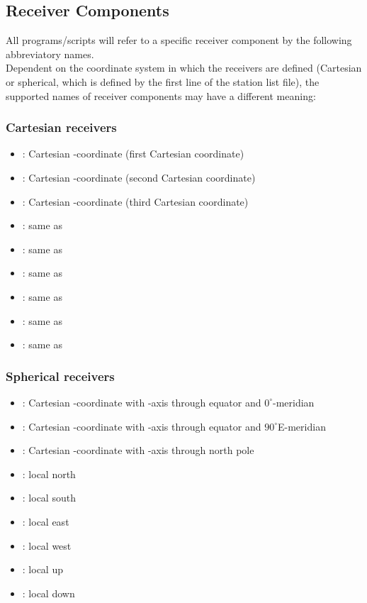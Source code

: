 \subsection*{Receiver Components}
%
All programs/scripts will refer to a specific receiver component by the following abbreviatory names.\\
Dependent on the coordinate system in which the receivers are defined (Cartesian or spherical, which is 
defined by the first line of the station list file), the supported names of receiver components may have a 
different meaning:
\subsubsection{Cartesian receivers}
\begin{itemize}
\item[] : Cartesian -coordinate (first Cartesian coordinate)
\item[] : Cartesian -coordinate (second Cartesian coordinate)
\item[] : Cartesian -coordinate (third Cartesian coordinate)
\item[] : same as 
\item[] : same as 
\item[] : same as 
\item[] : same as 
\item[] : same as 
\item[] : same as 
\end{itemize}
\subsubsection{Spherical receivers}
\begin{itemize}
\item[] : Cartesian -coordinate with -axis through equator and $0^\circ$-meridian
\item[] : Cartesian -coordinate with -axis through equator and $90^\circ$E-meridian
\item[] : Cartesian -coordinate with -axis through north pole
\item[] : local north
\item[] : local south
\item[] : local east
\item[] : local west
\item[] : local up
\item[] : local down
\end{itemize}
%
